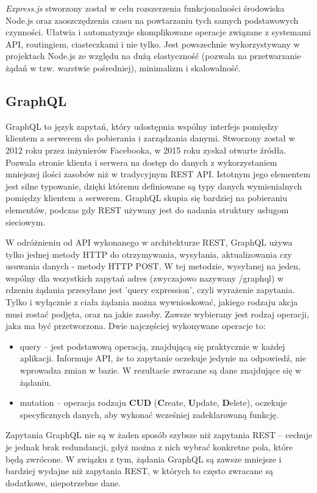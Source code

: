\documentclass[12pt,twoside]{article}
\begin{document}
\emph{Express.js} stworzony został w celu rozszerzenia funkcjonalności środowiska Node.js oraz zaoszczędzenia czasu na powtarzaniu tych samych podstawowych czynności. Ułatwia i automatyzuje skomplikowane operacje związane z systemami API, routingiem, ciasteczkami i nie tylko. Jest powszechnie wykorzystywany w projektach Node.js ze względu na dużą elastyczność (pozwala na przetwarzanie żądań w tzw. warstwie pośredniej), minimalizm i skalowalność.

\subsection{GraphQL}

GraphQL to język zapytań, który udostępnia wspólny interfejs pomiędzy klientem a serwerem do pobierania i zarządzania danymi. Stworzony został w 2012 roku przez inżynierów Facebooka, w 2015 roku zyskał otwarte źródła. Pozwala stronie klienta i serwera na dostęp do danych z wykorzystaniem mniejszej ilości zasobów niż w tradycyjnym REST API. Istotnym jego elementem jest silne typowanie, dzięki któremu definiowane są typy danych wymienialnych pomiędzy klientem a serwerem. GraphQL skupia się bardziej na pobieraniu elementów, podczas gdy REST używany jest do nadania struktury usługom sieciowym. 

W odróżnieniu od API wykonanego w architekturze REST, GraphQL używa tylko jednej metody HTTP do otrzymywania, wysyłania, aktualizowania czy usuwania danych - metody HTTP POST. W tej metodzie, wysyłanej na jeden, wspólny dla wszystkich zapytań adres (zwyczajowo nazywany /graphql) w rdzeniu żądania przesyłane jest 'query expression', czyli wyrażenie zapytania. Tylko i wyłącznie z ciała żądania można wywnioskować, jakiego rodzaju akcja musi zostać podjęta, oraz na jakie zasoby. Zawsze wybierany jest rodzaj operacji, jaka ma być przetworzona. Dwie najczęściej wykonywane operacje to:
\begin{itemize}
	\item query – jest podstawową operacją, znajdującą się praktycznie w każdej aplikacji. Informuje API, że to zapytanie oczekuje jedynie na odpowiedź, nie wprowadza zmian w bazie. W rezultacie zwracane są dane znajdujące się w żądaniu.
	\item mutation – operacja rodzaju \textbf{CUD} (\textbf{C}reate, \textbf{U}pdate, \textbf{D}elete), oczekuje specyficznych danych,
aby wykonać wcześniej zadeklarowaną funkcję.
\end{itemize} 
Zapytania GraphQL nie są w żaden sposób szybsze niż zapytania REST -- cechuje je jednak brak redundancji, gdyż można z nich wybrać konkretne pola, które będą zwrócone. W związku z tym, żądania GraphQL są zawsze mniejsze i bardziej wydajne niż zapytania REST, w których to często zwracane są dodatkowe, niepotrzebne dane.
\end{document}
